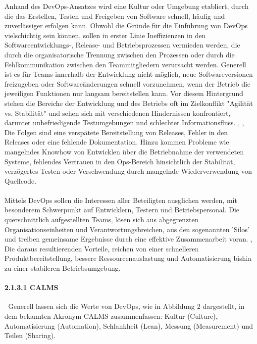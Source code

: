 Anhand des DevOps-Ansatzes wird eine Kultur oder Umgebung etabliert, durch die das Erstellen, Testen und Freigeben von Software schnell, häufig und zuverlässiger erfolgen kann. \cite[S.xxviii]{sharma_devops_2017} Obwohl die Gründe für die Einführung von DevOps vielschichtig sein können, sollen in erster Linie Ineffizienzen in den Softwareentwicklungs-, Release- und Betriebsprozessen vermieden werden, die durch die organisatorische Trennung zwischen den Prozessen \cite{lwakatare_devops_2019} oder durch die Fehlkommunikation zwischen den Teammitgliedern \cite{ebert_devops_2016} verursacht werden. Generell ist es für Teams innerhalb der Entwicklung nicht möglich, neue Softwareversionen freizugeben oder Softwareänderungen schnell vorzunehmen, wenn der Betrieb die jeweiligen Funktionen nur langsam bereitstellen kann. \cite[S. 7,8]{sharma_devops_2017} Vor diesem Hintergrund stehen die Bereiche der Entwicklung und des Betriebs oft im Zielkonflikt "Agilität vs. Stabilität" und sehen sich mit verschiedenen Hindernissen konfrontiert, darunter unbefriedigende Testumgebungen und schlechter Informationsfluss. \cite{lwakatare_devops_2019}, \cite[S. 8]{sharma_devops_2017}, \cite{konig_devopswelcome_2019} Die Folgen sind eine verspätete Bereitstellung von Releases, Fehler in den Releases oder eine fehlende Dokumentation. \cite[S. 24]{alt_innovationsorientiertes_2017} Hinzu kommen Probleme wie mangelndes Knowhow von Entwicklen über die Betriebnahme der verwendeten Systeme, fehlendes Vertrauen in den Ops-Bereich hinsichtlich der Stabilität, verzögertes Testen oder Verschwendung durch mangelnde Wiederverwendung von Quellcode. \cite{humble_why_2011}\\\\ Mittels DevOps sollen die Interessen aller Beteiligten ausglichen werden, mit besonderem Schwerpunkt auf Entwicklern, Testern und Betriebspersonal. \cite{humble_why_2011} Die querschnittlich aufgestellten Teams, lösen sich aus abgegrenzten Organisationseinheiten und Verantwortungsbreichen, aus den sogenannten 'Silos' und treiben gemeinsame Ergebnisse durch eine effektive Zusammenarbeit voran. \cite[S.5]{halstenberg_devops_2020}, \cite{sollner_devops_2017} Die daraus resultierenden Vorteile, reichen von einer schnelleren Produktbereitstellung, bessere Ressourcenauslastung und Automatisierung bishin zu einer stabileren Betriebsumgebung. 

\paragraph{2.1.3.1 CALMS} $~$
Generell lassen sich die Werte von DevOps, wie in Abbildung 2 dargestellt, in dem bekannten Akronym CALMS zusammenfassen: Kultur (Culture), Automatisierung (Automation), Schlankheit (Lean), Messung (Measurement) und Teilen (Sharing). 

